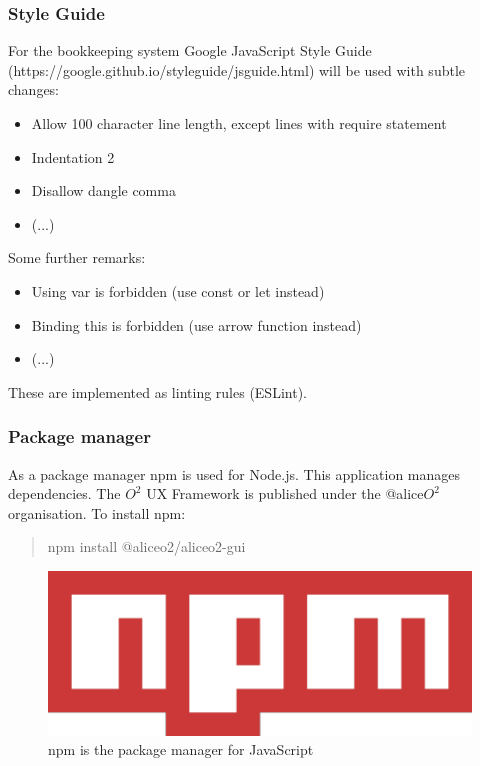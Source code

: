 \subsubsection{Style Guide}
For the bookkeeping system Google JavaScript Style Guide (https://google.github.io/styleguide/jsguide.html) will be used with subtle changes:
\begin{itemize}
  \item Allow 100 character line length, except lines with require statement
  \item Indentation 2
  \item Disallow dangle comma
  \item (...)
\end{itemize}
Some further remarks:
\begin{itemize}
  \item Using var is forbidden (use const or let instead)
  \item Binding this is forbidden (use arrow function instead)
  \item (...)
\end{itemize}
These are implemented as linting rules (ESLint).

\subsubsection{Package manager}
As a package manager npm is used for Node.js. This application manages dependencies. The $O^2$ UX Framework is published under the @alice$O^2$ organisation. To install npm:
\begin{quote}
  npm install @aliceo2/aliceo2-gui
\end{quote}

\begin{figure}[h]
  \begin{center}
    \includegraphics[scale=0.2]{./images/npm.png}
    \caption{npm is the package manager for JavaScript}
    \label{fig:}
  \end{center}
\end{figure}


